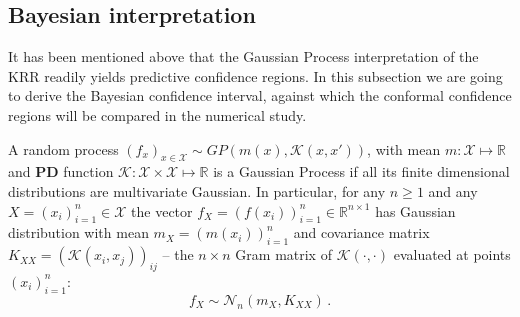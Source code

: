 \documentclass[a4paper,14pt]{extarticle}
\newcommand{\Ncal}{\mathcal{N}}
\newcommand{\Kcal}{\mathcal{K}}
\newcommand{\Xcal}{\mathcal{X}}
\newcommand{\Real}{\mathbb{R}}
\begin{document}

\subsection{Bayesian interpretation} %
\label{sub:bayesian_interpretation_of_krr}

It has been mentioned above that the Gaussian Process interpretation of the KRR
readily yields predictive confidence regions. In this subsection we are going to
derive the Bayesian confidence interval, against which the conformal confidence
regions will be compared in the numerical study.

A random process $(f_x)_{x\in \Xcal} \sim GP(m(x), \Kcal(x,x'))$, with mean $m : \Xcal
\mapsto \Real$ and \textbf{PD} function $\Kcal : \Xcal \times \Xcal \mapsto \Real$
is a Gaussian Process if all its finite dimensional distributions are multivariate
Gaussian. In particular, for any $n\geq1$ and any $X = (x_i)_{i=1}^n \in \Xcal$ the
vector $f_X = (f(x_i))_{i=1}^n \in \Real^{n\times 1}$ has Gaussian distribution with
mean $m_X = (m(x_i))_{i=1}^n$ and covariance matrix $K_{XX} = (\Kcal(x_i,x_j))_{ij}$ --
the $n\times n$ Gram matrix of $\Kcal(\cdot,\cdot)$ evaluated at points $(x_i)_{i=1}^n$:
\begin{equation*}
  f_X \sim \Ncal_n(m_X, K_{XX}) \,.
\end{equation*}
\end{document}
